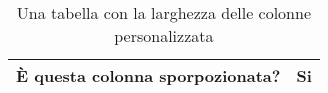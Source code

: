\begin{table}[H]
\centering
\begin{tabular}{|p{2cm}|p{10cm}|}
\hline
È questa colonna sporpozionata? & Si \\ \hline
\end{tabular}
\caption{Una tabella con la larghezza delle colonne personalizzata}
\label{tab:es_spoporzionata}
\end{table}
